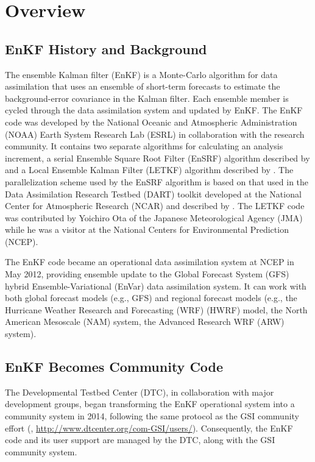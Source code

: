 \chapter{Overview}\label{overview}

\section{EnKF History and Background}

The ensemble Kalman filter (EnKF) is a Monte-Carlo algorithm for data assimilation that uses an ensemble of short-term forecasts to estimate the background-error covariance in the Kalman filter. Each ensemble member is cycled through the data assimilation system and updated by EnKF. The EnKF code was developed by the National Oceanic and Atmospheric Administration (NOAA) Earth System Research Lab (ESRL) in collaboration with the research community. It contains two separate algorithms for calculating an analysis increment, a serial Ensemble Square Root Filter (EnSRF) algorithm described by \cite{Whitaker2002} and a Local Ensemble Kalman Filter (LETKF) algorithm described by \cite{Hunt2007}. The parallelization scheme used by the EnSRF algorithm is based on that used in the Data Assimilation Research Testbed (DART) toolkit developed at the National Center for Atmospheric Research (NCAR) and described by \cite{Anderson2007}. The LETKF code was contributed by Yoichiro Ota of the Japanese Meteorological Agency (JMA) while he was a visitor at the National Centers for Environmental Prediction (NCEP).

The EnKF code became an operational data assimilation system at NCEP in May 2012, providing ensemble update to the Global Forecast System (GFS) hybrid Ensemble-Variational (EnVar) data assimilation system.  It can work with both global forecast models (e.g., GFS) and regional forecast models (e.g., the Hurricane Weather Research and Forecasting (WRF) (HWRF) model, the North American Mesoscale (NAM) system, the Advanced Research WRF (ARW) system).

\section{EnKF Becomes Community Code}

The Developmental Testbed Center (DTC), in collaboration with major development groups, began transforming the EnKF operational system into a community system in 2014, following the same protocol as the GSI community effort (\cite{Shao2016}, \url{http://www.dtcenter.org/com-GSI/users/}). Consequently, the EnKF code and its user support are managed by the DTC, along with the GSI community system. 

